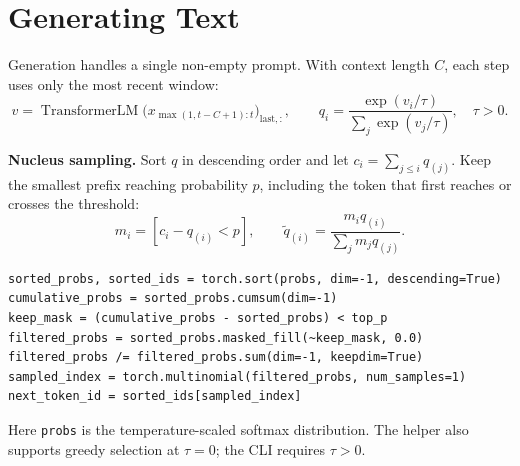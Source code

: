 \section{Generating Text}



Generation handles a single non-empty
prompt. With context length $C$, each step uses only the most recent window:
\[
v=\operatorname{TransformerLM}
\bigl(x_{\max(1,t-C+1):t}\bigr)_{\mathrm{last},:},\qquad
q_i=\frac{\exp(v_i/\tau)}{\sum_j\exp(v_j/\tau)},\quad \tau>0.
\]

\textbf{Nucleus sampling.} Sort $q$ in descending order and let
$c_i=\sum_{j\leq i}q_{(j)}$. Keep the smallest prefix reaching probability
$p$, including the token that first reaches or crosses the threshold:
\[
m_i=[c_i-q_{(i)}<p],\qquad
\widetilde q_{(i)}=\frac{m_iq_{(i)}}{\sum_jm_jq_{(j)}}.
\]
\par\noindent
\begin{minipage}{\linewidth}
\begin{lstlisting}[caption={Top-p filtering and token-ID recovery}]
sorted_probs, sorted_ids = torch.sort(probs, dim=-1, descending=True)
cumulative_probs = sorted_probs.cumsum(dim=-1)
keep_mask = (cumulative_probs - sorted_probs) < top_p
filtered_probs = sorted_probs.masked_fill(~keep_mask, 0.0)
filtered_probs /= filtered_probs.sum(dim=-1, keepdim=True)
sampled_index = torch.multinomial(filtered_probs, num_samples=1)
next_token_id = sorted_ids[sampled_index]
\end{lstlisting}
\end{minipage}\par
Here \texttt{probs} is the temperature-scaled softmax distribution. The
helper also supports greedy selection at $\tau=0$; the CLI requires $\tau>0$.

